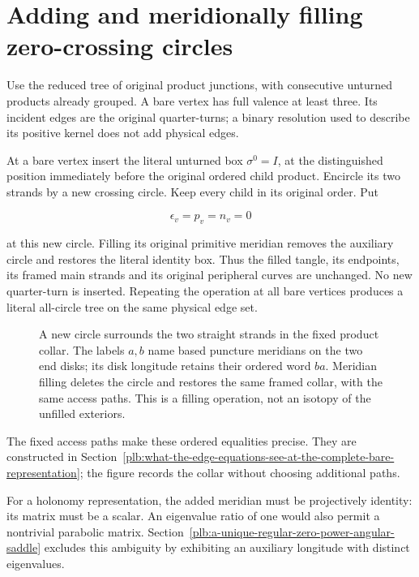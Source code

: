 \section{Adding and meridionally filling zero-crossing circles}\label{plb:the-literal-insertion}

Use the reduced tree of original product junctions, with consecutive unturned products already grouped. A bare vertex has full valence at least three. Its incident edges are the original quarter-turns; a binary resolution used to describe its positive kernel does not add physical edges.

At a bare vertex insert the literal unturned box \(\sigma^0=I\), at the distinguished position immediately before the original ordered child product. Encircle its two strands by a new crossing circle. Keep every child in its original order. Put

\begin{equation}\label{plb:1}
\epsilon_v=p_v=n_v=0
\end{equation}

at this new circle. Filling its original primitive meridian removes the auxiliary circle and restores the literal identity box. Thus the filled tangle, its endpoints, its framed main strands and its original peripheral curves are unchanged. No new quarter-turn is inserted. Repeating the operation at all bare vertices produces a literal all-circle tree on the same physical edge set.



\begin{figure}[tb]
\centering
\caption{A new circle surrounds the two straight strands in the fixed product collar. The labels $a,b$ name based puncture meridians on the two end disks;
its disk longitude retains their ordered word $ba$. Meridian filling deletes the circle and restores the same framed collar, with the same access paths. This is a filling operation, not an isotopy of the unfilled exteriors.}
\end{figure}

The fixed access paths make these ordered equalities precise. They
are constructed in Section~\ref{plb:what-the-edge-equations-see-at-the-complete-bare-representation}; the figure records the collar without
choosing additional paths.

For a holonomy representation, the added meridian must be projectively
identity: its matrix must be a scalar. An eigenvalue ratio of one would
also permit a nontrivial parabolic matrix. Section~\ref{plb:a-unique-regular-zero-power-angular-saddle} excludes this
ambiguity by exhibiting an auxiliary longitude with distinct eigenvalues.

